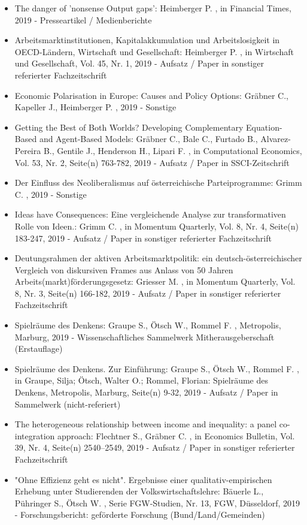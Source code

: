 \begin{itemize}
	 \item The danger of  'nonsense Output gaps': Heimberger P. , in Financial Times, 2019 - Presseartikel / Medienberichte
	 \item Arbeitsmarktinstitutionen, Kapitalakkumulation und Arbeitslosigkeit in OECD-Ländern, Wirtschaft und Gesellschaft: Heimberger P. , in Wirtschaft und Gesellschaft, Vol. 45, Nr. 1, 2019 - Aufsatz / Paper in sonstiger referierter Fachzeitschrift
	 \item Economic Polarisation in Europe: Causes and Policy Options: Gräbner C., Kapeller J., Heimberger P. , 2019 - Sonstige
	 \item Getting the Best of Both Worlds? Developing Complementary Equation-Based and Agent-Based Models: Gräbner C., Bale C., Furtado B., Alvarez-Pereira B., Gentile J., Henderson H., Lipari F. , in Computational Economics, Vol. 53, Nr. 2, Seite(n) 763-782, 2019 - Aufsatz / Paper in SSCI-Zeitschrift
	 \item Der Einfluss des Neoliberalismus auf österreichische Parteiprogramme: Grimm C. , 2019 - Sonstige
	 \item Ideas have Consequences: Eine vergleichende Analyse zur transformativen Rolle von Ideen.: Grimm C. , in Momentum Quarterly, Vol. 8, Nr. 4, Seite(n) 183-247, 2019 - Aufsatz / Paper in sonstiger referierter Fachzeitschrift
	 \item Deutungsrahmen der aktiven Arbeitsmarktpolitik: ein deutsch-österreichischer Vergleich von diskursiven Frames aus Anlass von 50 Jahren Arbeits(markt)förderungsgesetz: Griesser M. , in Momentum Quarterly, Vol. 8, Nr. 3, Seite(n) 166-182, 2019 - Aufsatz / Paper in sonstiger referierter Fachzeitschrift
	 \item Spielräume des Denkens: Graupe S., Ötsch W., Rommel F. , Metropolis, Marburg, 2019 - Wissenschaftliches Sammelwerk Mitherausgeberschaft (Erstauflage)
	 \item Spielräume des Denkens. Zur Einführung: Graupe S., Ötsch W., Rommel F. , in Graupe, Silja; Ötsch, Walter O.; Rommel, Florian: Spielräume des Denkens, Metropolis, Marburg, Seite(n) 9-32, 2019 - Aufsatz / Paper in Sammelwerk (nicht-referiert)
	 \item The heterogeneous relationship between income and inequality: a panel co-integration approach: Flechtner S., Gräbner C. , in Economics Bulletin, Vol. 39, Nr. 4, Seite(n) 2540–2549, 2019 - Aufsatz / Paper in sonstiger referierter Fachzeitschrift
	 \item "Ohne Effizienz geht es nicht". Ergebnisse einer qualitativ-empirischen Erhebung unter Studierenden der Volkswirtschaftslehre: Bäuerle L., Pühringer S., Ötsch W. , Serie FGW-Studien, Nr. 13, FGW, Düsseldorf, 2019 - Forschungsbericht: geförderte Forschung (Bund/Land/Gemeinden)

\end{itemize}
